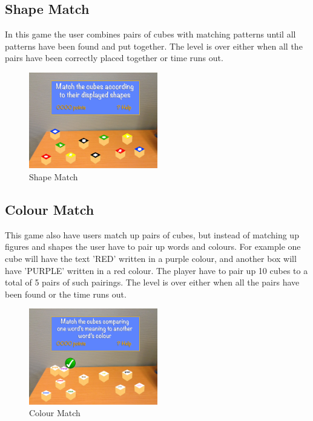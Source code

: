 \subsection{Shape Match}
\label{game:shape_match} 
In this game the user combines pairs of cubes with matching patterns until all patterns have been found and put together.
The level is over either when all the pairs have been correctly placed together or time runs out.

\begin{figure}
	\includegraphics[width=0.5\textwidth]{images/Costas/game_mockup1(matching).jpg}
	\caption{Shape Match}
	\label{fig:Costas}
	
\end{figure}

\subsection{Colour Match}
\label{game:colour_match}
This game also have users match up pairs of cubes, but instead of matching up figures and shapes the user have to pair up words and colours. For example one cube will have the text 'RED' written in a purple colour, and another box will have 'PURPLE' written in a red colour. The player have to pair up 10 cubes to a total of 5 pairs of such pairings.
The level is over either when all the pairs have been found or the time runs out.

\begin{figure}
	\includegraphics[width=0.5\textwidth]{images/Costas/game_mockup1(matching2).jpg}
	\caption{Colour Match}
	\label{fig:Costas}
	
\end{figure}

